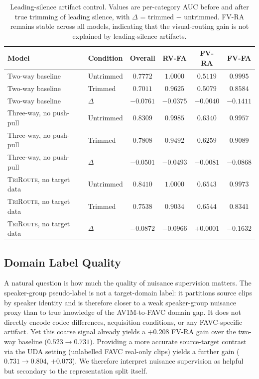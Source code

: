 \documentclass{article}
\newcommand{\method}{\textsc{TriRoute}}
\begin{document}
\begin{table}[t]
    \centering
    \caption{Leading-silence artifact control. Values are per-category AUC before and after true trimming of leading silence, with $\Delta$ = trimmed $-$ untrimmed. FV-RA remains stable across all models, indicating that the visual-routing gain is not explained by leading-silence artifacts.}
    \label{tab:silence_control}
    \small
    \begin{tabular}{llcccc}
        \toprule
        Model & Condition & Overall & RV-FA & FV-RA & FV-FA \\
        \midrule
        Two-way baseline & Untrimmed & $0.7772$ & $1.0000$ & $0.5119$ & $0.9995$ \\
        Two-way baseline & Trimmed   & $0.7011$ & $0.9625$ & $0.5079$ & $0.8584$ \\
        Two-way baseline & $\Delta$  & $-0.0761$ & $-0.0375$ & $\mathbf{-0.0040}$ & $-0.1411$ \\
        \midrule
        Three-way, no push-pull & Untrimmed & $0.8309$ & $0.9985$ & $0.6340$ & $0.9957$ \\
        Three-way, no push-pull & Trimmed   & $0.7808$ & $0.9492$ & $0.6259$ & $0.9089$ \\
        Three-way, no push-pull & $\Delta$  & $-0.0501$ & $-0.0493$ & $\mathbf{-0.0081}$ & $-0.0868$ \\
        \midrule
        \method, no target data & Untrimmed & $0.8410$ & $1.0000$ & $0.6543$ & $0.9973$ \\
        \method, no target data & Trimmed   & $0.7538$ & $0.9034$ & $0.6544$ & $0.8341$ \\
        \method, no target data & $\Delta$  & $-0.0872$ & $-0.0966$ & $\mathbf{+0.0001}$ & $-0.1632$ \\
        \bottomrule
    \end{tabular}
\end{table}

\subsection{Domain Label Quality}
\label{sec:domain_label_quality}

A natural question is how much the quality of nuisance supervision matters. The speaker-group pseudo-label is not a target-domain label: it partitions source clips by speaker identity and is therefore closer to a weak speaker-group nuisance proxy than to true knowledge of the AV1M-to-FAVC domain gap. It does not directly encode codec differences, acquisition conditions, or any FAVC-specific artifact. Yet this coarse signal already yields a $+0.208$ FV-RA gain over the two-way baseline ($0.523 \to 0.731$). Providing a more accurate source-target contrast via the UDA setting (unlabelled FAVC real-only clips) yields a further gain ($0.731 \to 0.804$, $+0.073$). We therefore interpret nuisance supervision as helpful but secondary to the representation split itself.
\end{document}
